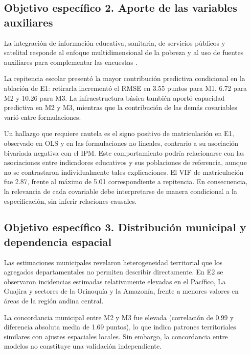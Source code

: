 \subsection*{Objetivo específico 2. Aporte de las variables auxiliares}

La integración de información educativa, sanitaria, de servicios públicos y satelital responde al enfoque multidimensional de la pobreza y al uso de fuentes auxiliares para complementar las encuestas \cite{alkire2011,LopezSanchezPerez_2021,CEPAL_PovertyMapping_2022,CEPAL_DPS_MapaPobreza_2021}.

La repitencia escolar presentó la mayor contribución predictiva condicional en la ablación de E1: retirarla incrementó el RMSE en 3.55 puntos para M1, 6.72 para M2 y 10.26 para M3. La infraestructura básica también aportó capacidad predictiva en M2 y M3, mientras que la contribución de las demás covariables varió entre formulaciones.

Un hallazgo que requiere cautela es el signo positivo de matriculación en E1, observado en OLS y en las formulaciones no lineales, contrario a su asociación bivariada negativa con el IPM. Este comportamiento podría relacionarse con las asociaciones entre indicadores educativos y sus poblaciones de referencia, aunque no se contrastaron individualmente tales explicaciones. El VIF de matriculación fue 2.87, frente al máximo de 5.01 correspondiente a repitencia. En consecuencia, la relevancia de cada covariable debe interpretarse de manera condicional a la especificación, sin inferir relaciones causales.

\subsection*{Objetivo específico 3. Distribución municipal y dependencia espacial}

Las estimaciones municipales revelaron heterogeneidad territorial que los agregados departamentales no permiten describir directamente. En E2 se observaron incidencias estimadas relativamente elevadas en el Pacífico, La Guajira y sectores de la Orinoquía y la Amazonía, frente a menores valores en áreas de la región andina central.

La concordancia municipal entre M2 y M3 fue elevada (correlación de 0.99 y diferencia absoluta media de 1.69 puntos), lo que indica patrones territoriales similares con ajustes espaciales locales. Sin embargo, la concordancia entre modelos no constituye una validación independiente.

